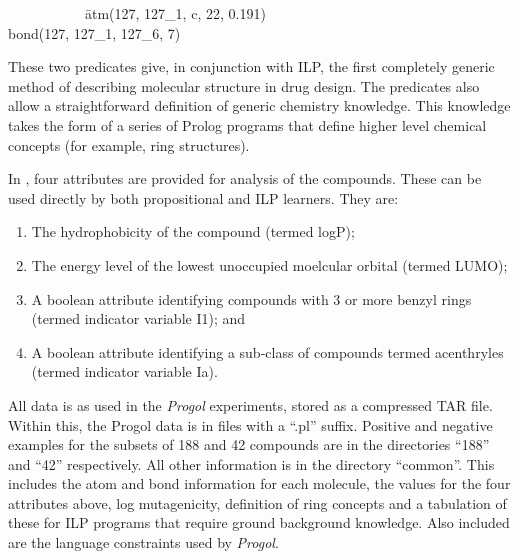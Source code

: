 \begin{tabbing}
\ \ \ \ \ \ \ \ \ \ \ \= atm(127, 127\_1, c, 22, 0.191) \\
\> bond(127, 127\_1, 127\_6, 7) 
\end{tabbing}


These two predicates give, in conjunction with ILP, the first completely
generic method of describing molecular structure in drug design.
The predicates also allow a straightforward definition
of generic chemistry knowledge.
This knowledge takes the form of a series of Prolog programs that
define higher level chemical concepts (for example, ring structures).

In \cite{hansch:carcin}, four attributes are provided for analysis of the
compounds. These can be used directly by both propositional and ILP learners. They are:
\begin{enumerate}
\item The hydrophobicity of the compound (termed logP); 
\item The energy level of the lowest unoccupied moelcular orbital (termed LUMO);
\item A boolean attribute identifying compounds with 3 or more benzyl rings
	(termed indicator variable I1); and
\item A boolean attribute identifying a sub-class of compounds termed acenthryles
	(termed indicator variable Ia).
\end{enumerate}

All data is as used in the {\em Progol\/} experiments, stored
as a compressed TAR file. Within this, the Progol data is
in files with a ``.pl'' suffix. Positive and negative examples for
the subsets of 188 and 42 compounds are in the directories ``188'' and ``42''
respectively. All other information is in the directory ``common''.
This includes the atom and bond information for each molecule, the 
values for the four attributes above, log mutagenicity, definition of
ring concepts and a tabulation of these for ILP programs that require
ground background knowledge. Also included are the language constraints
used by {\em Progol\/}.


